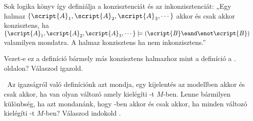 \problempart
\label{pr.SemanticsEssay}
\begin{earg}
\item Sok logika könyv így definiálja a konzisztenciát és az inkonzisztenciát:
„Egy halmaz $\{\script{A}_1,\script{A}_2,\script{A}_3,\cdots\}$ akkor és csak akkor konzisztens, ha $\{\script{A}_1,\script{A}_2,\script{A}_3,\cdots\}\models(\script{B}\eand\enot\script{B})$ valamilyen  mondatra. A halmaz konzisztens ha nem inkonzisztens.”

Vezet-e ez a definíció bármely más konzisztens halmazhoz mint a definíció a \pageref{def.consistencySL}. oldalon? Válaszod igazold.

\item\leftsolutions\ Az igazságról való definíciónk azt mondja, egy  kijelentés  az  modellben akkor és csak akkor, ha van olyan változó amely kielégíti -t $M$-ben. Lenne bármilyen különbség, ha azt mondanánk, hogy   -ben akkor és csak akkor, ha minden változó kielégíti -t $M$-ben? Válaszod indokold .
\end{earg}

